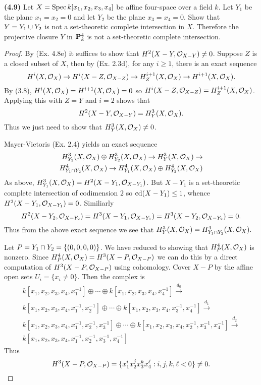 \documentclass[12pt]{article}
\begin{document}
\begin{exercise}
{\bfseries (4.9)} Let $X=\spec k[x_1,x_2,x_3,x_4]$ be affine four-space
over a field $k$. Let $Y_1$ be the plane $x_1=x_2=0$ and let $Y_2$
be the plane $x_3=x_4=0$. Show that $Y=Y_1\union Y_2$
is not a set-theoretic complete intersection in $X$. Therefore
the projective closure $\overline{Y}$ in $\P_k^4$ is not
a set-theoretic complete intersection.
\end{exercise}
\begin{proof}
By (Ex. 4.8e) it suffices to show that 
$H^2(X-Y,\so_{X-Y})\neq 0$.  
Suppose $Z$ is a closed subset of $X$, then by (Ex. 2.3d), 
for any $i\geq 1$, there is an exact sequence 
$$H^i(X,\sox)\into H^i(X-Z,\so_{X-Z})\into
  H_{Z}^{i+1}(X,\sox)\into H^{i+1}(X,\sox).$$
By (3.8), $H^i(X,\sox)=H^{i+1}(X,\sox)=0$ so 
$H^i(X-Z,\so_{X-Z})=H_{Z}^{i+1}(X,\sox)$.
Applying this with $Z=Y$ and $i=2$ shows that
$$H^2(X-Y,\so_{X-Y})=H_{Y}^3(X,\sox).$$ Thus
we just need to show that $H_{Y}^3(X,\sox)\neq 0$.

Mayer-Vietoris (Ex. 2.4) yields an exact sequence
\begin{align*}
H^3_{Y_1}(X,\sox)\oplus{}H^3_{Y_2}(X,\sox)\into{}H^3_Y(X,\sox)\into\\
H^4_{Y_1\intersect{}Y_2}(X,\sox)\into{}
H^4_{Y_1}(X,\sox)\oplus{}H^4_{Y_2}(X,\sox)
\end{align*}
As above, $H^3_{Y_1}(X,\sox)=H^2(X-Y_1,\so_{X-Y_1})$. 
But $X-Y_1$ is a set-theoretic complete intersection 
of codimension $2$ so $\cd(X-Y_1)\leq 1$,
whence $H^2(X-Y_1,\so_{X-Y_1})=0$. Similiarly
$$H^2(X-Y_2,\so_{X-Y_2})=H^3(X-Y_1,\so_{X-Y_1})
=H^3(X-Y_2,\so_{X-Y_2})=0.$$ Thus from the above exact
sequence we see that
$H^3_Y(X,\sox)=H^4_{Y_1\intersect{}Y_2}(X,\sox).$

Let $P=Y_1\intersect{}Y_2=\{(0,0,0,0)\}$. 
We have reduced to showing that 
$H^4_{P}(X,\sox)$ is nonzero. Since $H^4_{P}(X,\sox)=H^3(X-P,\so_{X-P})$
we can do this by a direct computation of $H^3(X-P,\so_{X-P})$ using 
\cech{} cohomology. Cover $X-P$ by the affine
open sets $U_i=\{x_i\neq{}0\}$. Then the \cech{} complex is
$$\begin{array}{l}
k[x_1,x_2,x_3,x_4,x_1^{-1}]\oplus\cdots\oplus  
k[x_1,x_2,x_3,x_4,x_4^{-1}]\xrightarrow{d_0}\\
k[x_1,x_2,x_3,x_4,x_1^{-1},x_2^{-1}]\oplus\cdots\oplus  
k[x_1,x_2,x_3,x_4,x_3^{-1},x_4^{-1}]\xrightarrow{d_1}\\
k[x_1,x_2,x_3,x_4,x_1^{-1},x_2^{-1},x_3^{-1}]\oplus\cdots\oplus  
k[x_1,x_2,x_3,x_4,x_2^{-1},x_3^{-1},x_4^{-1}]\xrightarrow{d_2}\\
k[x_1,x_2,x_3,x_4,x_1^{-1},x_2^{-1},x_3^{-1},x_4^{-1}]  
\end{array}$$
Thus 
$$H^3(X-P,\so_{X-P})
       = \{x_1^ix_2^jx_3^kx_4^{\ell}:i,j,k,\ell<0\}\neq 0.$$
\end{proof}
\end{document}

